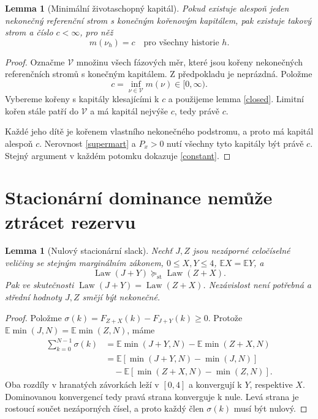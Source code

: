\documentclass[11pt,a4paper]{article}
\newtheorem{lemma}[theorem]{Lemma}
\newcommand{\E}{\mathbb E}
\newcommand{\st}{\mathrm{st}}
\newcommand{\Law}{\operatorname{Law}}
\begin{document}
\begin{lemma}[Minimální životaschopný kapitál]\label{minimum}
Pokud existuje alespoň jeden nekonečný referenční strom s konečným
kořenovým kapitálem, pak existuje takový strom a číslo $c<\infty$,
pro něž
\begin{equation}\label{constant}
m(\nu_h)=c\quad\text{pro všechny historie }h.
\end{equation}
\end{lemma}
\begin{proof}
Označme $\mathcal V$ množinu všech fázových měr, které jsou kořeny
nekonečných referenčních stromů s konečným kapitálem. Z předpokladu
je neprázdná. Položme
\[
c=\inf_{\nu\in\mathcal V}m(\nu)\in[0,\infty).
\]
Vybereme kořeny s kapitály klesajícími k $c$ a použijeme lemma
\ref{closed}. Limitní kořen stále patří do $\mathcal V$ a má kapitál
nejvýše $c$, tedy právě $c$.

Každé jeho dítě je kořenem vlastního nekonečného podstromu, a proto
má kapitál alespoň $c$. Nerovnost \eqref{supermart} a $P_x>0$ nutí
všechny tyto kapitály být právě $c$. Stejný argument v každém
potomku dokazuje \eqref{constant}.
\end{proof}

\section{Stacionární dominance nemůže ztrácet rezervu}
\begin{lemma}[Nulový stacionární slack]\label{stationary}
Nechť $J,Z$ jsou nezáporné celočíselné veličiny se stejným
marginálním zákonem, $0\le X,Y\le4$, $\E X=\E Y$, a
\[
\Law(J+Y)\succeq_{\st}\Law(Z+X).
\]
Pak ve skutečnosti $\Law(J+Y)=\Law(Z+X)$.
Nezávislost není potřebná a střední hodnoty $J,Z$ smějí být nekonečné.
\end{lemma}
\begin{proof}
Položme $\sigma(k)=F_{Z+X}(k)-F_{J+Y}(k)\ge0$.
Protože $\E\min(J,N)=\E\min(Z,N)$, máme
\begin{align*}
\sum_{k=0}^{N-1}\sigma(k)
&=\E\min(J+Y,N)-\E\min(Z+X,N)\\
&=\E[\min(J+Y,N)-\min(J,N)]\\
&\quad-\E[\min(Z+X,N)-\min(Z,N)].
\end{align*}
Oba rozdíly v hranatých závorkách leží v $[0,4]$ a konvergují
k $Y$, respektive $X$. Dominovanou konvergencí tedy pravá strana
konverguje k nule. Levá strana je rostoucí součet nezáporných
čísel, a proto každý člen $\sigma(k)$ musí být nulový.
\end{proof}
\end{document}
